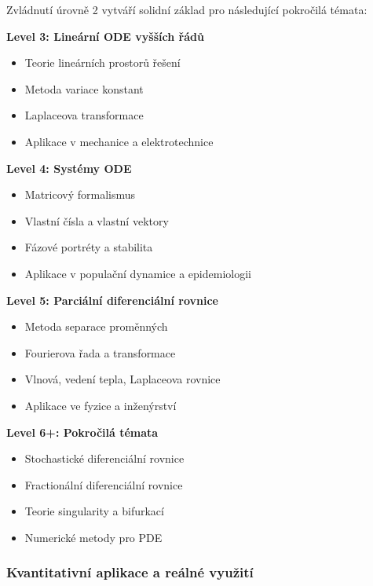 Zvládnutí úrovně 2 vytváří solidní základ pro následující pokročilá témata:

\vspace{1\baselineskip}

\noindent\textbf{Level 3: Lineární ODE vyšších řádů}
\begin{itemize}
\item Teorie lineárních prostorů řešení
\item Metoda variace konstant
\item Laplaceova transformace
\item Aplikace v mechanice a elektrotechnice
\end{itemize}

\vspace{1\baselineskip}

\noindent\textbf{Level 4: Systémy ODE}
\begin{itemize}
\item Matricový formalismus
\item Vlastní čísla a vlastní vektory
\item Fázové portréty a stabilita
\item Aplikace v populační dynamice a epidemiologii
\end{itemize}

\vspace{1\baselineskip}

\noindent\textbf{Level 5: Parciální diferenciální rovnice}
\begin{itemize}
\item Metoda separace proměnných
\item Fourierova řada a transformace
\item Vlnová, vedení tepla, Laplaceova rovnice
\item Aplikace ve fyzice a inženýrství
\end{itemize}

\vspace{1\baselineskip}

\noindent\textbf{Level 6+: Pokročilá témata}
\begin{itemize}
\item Stochastické diferenciální rovnice
\item Fractionální diferenciální rovnice
\item Teorie singularity a bifurkací
\item Numerické metody pro PDE
\end{itemize}

\subsubsection{Kvantitativní aplikace a reálné využití}
\label{subsec:aplikace-uroven2}

